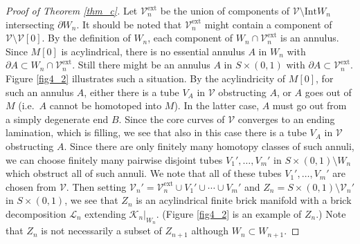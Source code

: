 \documentclass{amsart}
\theoremstyle{definition}
\numberwithin{figure}{section}
\numberwithin{equation}{section}
\newcommand{\ie}{i.e.\ }
\def\ck{\mathcal{K}}
\def\cv{\mathcal{V}}
\def\part{\partial}
\def\Int{\mathrm{Int}}
\begin{document}
\begin{proof}[Proof of Theorem \ref{thm_c}]
Let $\cv_{n}^{\mathrm{ext}}$ be the union of components of $\cv\setminus \Int W_n$ intersecting $\part W_n$.
It should be noted that  $\cv_n^{\mathrm{ext}}$ might contain a component of $\cv\setminus \cv[0]$.
By the definition of $W_n$, each component of $W_n\cap \cv_n^{\mathrm{ext}}$ is an annulus.
Since $M[0]$ is acylindrical, there is no essential annulus $A$ in $W_n$ with $\part A\subset W_n\cap \cv_n^{\mathrm{ext}}$. 
Still there might be an annulus $A$ in $S\times (0,1)$ with $\partial A \subset \cv_n^{\mathrm{ext}}$.
Figure \ref{fig4_2} illustrates such a situation.
By the acylindricity of $M[0]$, for such an annulus $A$,  either there is a tube $V_A$ in $\cv$ obstructing $A$, or $A$ goes out of $M$ (\ie $A$ cannot be homotoped into $M$).
In the latter case, $A$ must go out from a simply degenerate end $B$.
Since the core curves of $\cv$ converges to an ending lamination, which is filling, we see that also in this case there is a tube $V_A$ in $\cv$ obstructing $A$.
Since there are only finitely many homotopy classes of such annuli,
we can choose finitely many pairwise disjoint tubes $V_1',\dots,V_m'$ in $S\times (0,1)\setminus W_n$ which obstruct all of such annuli. 
We note that all of these tubes $V_1', \dots, V_m'$ are chosen from $\cv$.
Then setting $\cv_n'=\cv_n^{\mathrm{ext}}\cup V_1'\cup\cdots\cup V_m'$ and $Z_n=S\times (0,1)\setminus \cv_n'$ in $S\times (0,1)$, we see that $Z_n$ is an acylindrical finite brick 
manifold with a brick decomposition $\mathcal L_n$ extending $\ck_n|_{W_n}$.
(Figure \ref{fig4_2} is an example of $Z_n$.)
Note that $Z_n$ is not necessarily a subset of $Z_{n+1}$ although $W_n\subset W_{n+1}$.


\end{proof}
\end{document}
